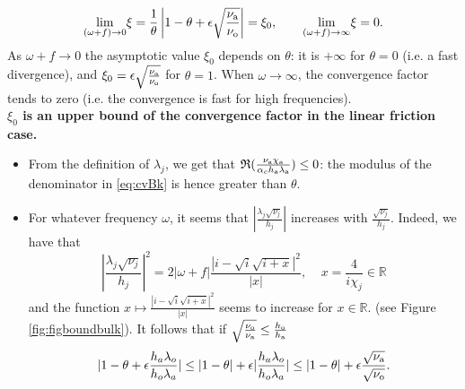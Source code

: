 \[
 \underset{(\omega+f) \rightarrow 0}{\mathrm{lim}} \xi = \frac{1}{\theta} \left| 1-\theta+\epsilon \sqrt{\frac{\nu_{\rm a}}{\nu_{\rm o}}}  \right| = \xi_0, \qquad
 \underset{(\omega+f) \rightarrow \infty}{\mathrm{lim}} \xi = 0.
\]
As $\omega + f \to 0$ the asymptotic value 
$\xi_0$ depends on $\theta$: it is $+\infty$ for $\theta=0$ (i.e. a fast divergence), and $\xi_0 = \epsilon\sqrt{\frac{\nu_{\rm a}}{\nu_{\rm o}}}$ for $\theta=1$.
When $\omega\to \infty$, the convergence factor tends to zero 
(i.e. the convergence is fast for high frequencies).
\\[3mm]
\textbf{$\xi_0$ is an upper bound of the convergence factor in the linear friction case.}\hspace*{5mm} %
\begin{itemize}
    \item From the definition of $\lambda_j$, we get that $\mathfrak{R}(\frac{\nu_{\rm a}\chi_{\rm a}}{\alpha_c h_{\rm a} \lambda_{\rm a}}) \leq 0$: the modulus of the denominator in \eqref{eq:cvBk} is hence greater than $\theta$.
    \item For whatever frequency $\omega$, it seems that $\left|\frac{\lambda_j \sqrt{\nu_j}}{h_j}\right|$ increases with $\frac{\sqrt{\nu_j}}{h_j}$.
    Indeed, we have that
	\begin{equation}
	\left|\frac{\lambda_j \sqrt{\nu_j}}{h_j}\right|^2
		= 2|\omega + f| \frac{|i-\sqrt{i}\sqrt{i+x}|^2}{|x|},
		~~~~~ x = \frac{4}{i \chi_j} \in \mathbb{R}
	\end{equation}
	and the function
	$x \mapsto \frac{|i-\sqrt{i}\sqrt{i+x}|^2}{|x|}$
		seems to increase for $x \in \mathbb{R}$.
    (see Figure \ref{fig:figboundbulk}). It follows that if $\sqrt{\frac{\nu_{\rm o}}{\nu_{\rm a}}} \leq \frac{h_{\rm o}}{h_{\rm a}}$
\begin{equation}
    |1-\theta+\epsilon \frac{h_a \lambda_o}{h_o \lambda_a}| \leq | 1 - \theta| + \epsilon |\frac{h_a \lambda_o}{h_o \lambda_a}| \leq 
    |1 - \theta| + \epsilon \frac{\sqrt{\nu_{\rm a}}}{\sqrt{\nu_{\rm o}}}.
\end{equation}
\end{itemize}
